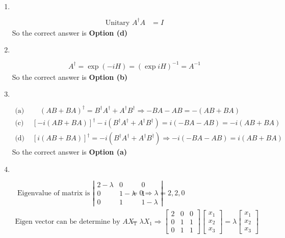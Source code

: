 \begin{enumerate}
\item $\left. \right. $
\begin{answer}
	\begin{align*}
	\text{Unitary }A^{\dagger} A&=I
	\end{align*}
	So the correct answer is \textbf{Option (d)}
\end{answer}
\item $\left. \right. $
\begin{answer}
	\begin{align*}
	A^{\dagger}=\exp (-i H)=(\exp i H)^{-1}=A^{-1}
	\end{align*}
		So the correct answer is \textbf{Option (b)}
\end{answer}
\item $\left. \right. $
\begin{answer}
	\begin{align*}
	\text{(a) }&\quad(A B+B A)^{\dagger}=B^{\dagger} A^{\dagger}+A^{\dagger} B^{\dagger} \Rightarrow-B A-A B=-(A B+B A)\\
	\text{(c) }&[-i(A B+B A)]^{\dagger}-i\left(B^{\dagger} A^{\dagger}+A^{\dagger} B^{\dagger}\right)=i(-B A-A B)=-i(A B+B A)\\
\text{(d) }&[i(A B+B A)]^{\dagger}=-i\left(B^{\dagger} A^{\dagger}+A^{\dagger} B^{\dot{\dagger}}\right) \Rightarrow-i(-B A-A B)=i(A B+B A)
	\end{align*}
	So the correct answer is \textbf{Option (a)}
\end{answer}
\item $\left. \right. $
\begin{answer}
	\begin{align*}
\text{	Eigenvalue of matrix is }\left|\begin{array}{ccc}2-\lambda & 0 & 0 \\ 0 & 1-\lambda & 1 \\ 0 & 1 & 1-\lambda\end{array}\right|&=0 \Rightarrow \lambda=2,2,0\\
\text{Eigen vector can be determine by }A X_{1}&=\lambda X_{1} \Rightarrow\left[\begin{array}{lll}2 & 0 & 0 \\ 0 & 1 & 1 \\ 0 & 1 & 1\end{array}\right]\left[\begin{array}{l}x_{1} \\ x_{2} \\ x_{3}\end{array}\right]=\lambda\left[\begin{array}{l}x_{1} \\ x_{2} \\ x_{3}\end{array}\right]

\end{align*}
\end{answer}
\end{enumerate}
